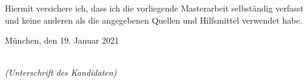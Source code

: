 %
%
%
%

\newpage

\thispagestyle{empty}

\begin{large}

\vspace*{2cm}

\noindent
Hiermit versichere ich, dass ich die vorliegende Masterarbeit
selbständig verfasst und keine anderen als die angegebenen Quellen
und Hilfsmittel verwendet habe.

\vspace{2cm}

\noindent
München, den 19. Januar 2021

\vspace{3cm}

\hspace*{7cm}%
\dotfill\\
\hspace*{8.5cm}%
\textit{(Unterschrift des Kandidaten)}

\end{large}
